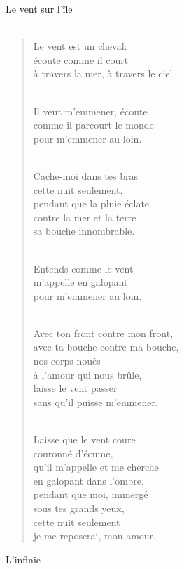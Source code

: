 \documentclass[11pt,a4paper]{book}
\begin{document}
\newpage

{\huge Le vent sur l'île} \\ \\

\begin{verse}
Le vent est un cheval: \\
écoute comme il court \\
à travers la mer, à travers le ciel. \\ \

Il veut m'emmener, écoute \\
comme il parcourt le monde \\
pour m'emmener au loin. \\ \

Cache-moi dans tes bras \\
cette nuit seulement, \\
pendant que la pluie éclate \\
contre la mer et la terre \\
sa bouche innombrable. \\ \

Entends comme le vent \\
m'appelle en galopant \\
pour m'emmener au loin. \\ \

Avec ton front contre mon front, \\
avec ta bouche contre ma bouche, \\
nos corps noués \\
à l'amour qui nous brûle, \\
laisse le vent passer \\
sans qu'il puisse m'emmener. \\ \

Laisse que le vent coure \\
couronné d'écume, \\
qu'il m'appelle et me cherche \\
en galopant dans l'ombre, \\
pendant que moi, immergé \\
sous tes grands yeux, \\
cette nuit seulement \\
je me reposerai, mon amour.
\end{verse}

\newpage

{\huge L'infinie} \\ \\
\end{document}

